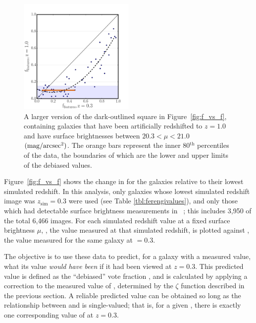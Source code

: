 \documentclass[twocolumn]{aastex6}
\begin{document}
\begin{figure}
\centering
\includegraphics[width=0.5\textwidth]{figures/z1_mu20_subplot2.pdf}
\caption{A larger version of the dark-outlined square in Figure~\ref{fig:f_vs_f}, containing
\ferengi{} galaxies that have been artificially redshifted to $z=1.0$ and have
surface brightnesses between $20.3 < \mu < 21.0$ $\rm (mag/arcsec^2)$. The orange bars represent the inner
80$^\mathrm{th}$ percentiles of the data, the boundaries of which are the lower
and upper limits of the debiased values.}
\label{fig:f_vs_f_zoom}
\end{figure}


Figure~\ref{fig:f_vs_f} shows the change in \ffeatures{} for the \ferengi{}
galaxies relative to their lowest simulated redshift. In this analysis, only
galaxies whose lowest simulated redshift image was $z_\mathrm{sim}=0.3$ were
used (see Table \ref{tbl:ferengivalues}), and only those which had detectable
surface brightness measurements in \sextractor~\citep{mel16}; this includes 3,950 of the
total 6,466 images. For each simulated redshift value \zsim{} at a fixed
surface brightness $\mu$, \ffeaturesz, the value measured at that simulated
redshift, is plotted against \ffeaturesrest, the value measured for the same
galaxy at \zsim$=0.3$. 
 
The objective is to use these data to predict, for a galaxy with a measured
\ffeaturesz{} value, what its \ffeatures{} value \emph{would have been} if it
had been viewed at $z=0.3$. This predicted value is defined as the ``debiased''
vote fraction \ffeaturesdebiased, and is calculated by applying a correction to
the measured value of \ffeatures, determined by the $\zeta$ function described
in the previous section. A reliable predicted value can be obtained so long as
the relationship between \ffeaturesz{} and \ffeaturesrest{} is single-valued;
that is, for a given \ffeaturesz, there is exactly one corresponding value of
\ffeatures{} at $z=0.3$. 
\end{document}
